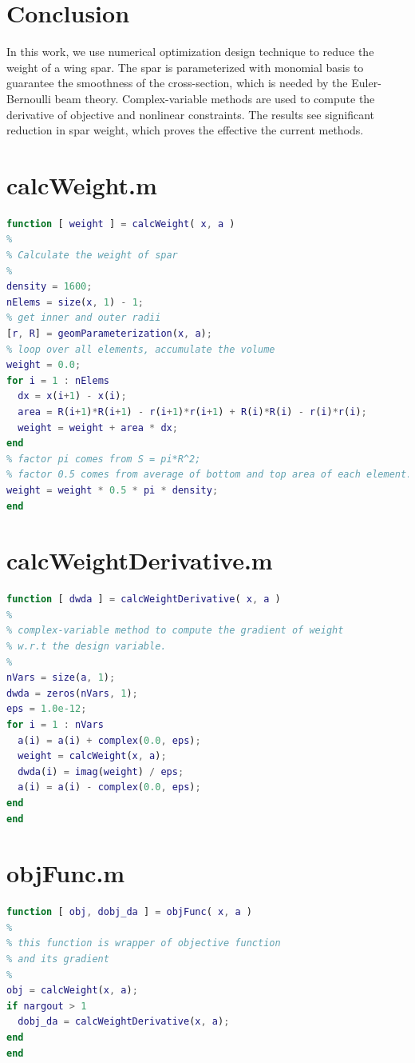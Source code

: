 \documentclass[a4paper]{article}
\begin{document}
\section{Conclusion}
In this work, we use numerical optimization design technique to reduce the weight of a wing spar. The spar is parameterized with monomial basis to guarantee the smoothness of the cross-section, which is needed by the Euler-Bernoulli beam theory. Complex-variable methods are used to compute the derivative of objective and nonlinear constraints. The results see significant reduction in spar weight, which proves the effective the current methods.

\small
\begin{appendices} 
\section{calcWeight.m}\label{app:calcweight}
\begin{lstlisting}[language=Matlab]
function [ weight ] = calcWeight( x, a )
%
% Calculate the weight of spar
%
density = 1600;
nElems = size(x, 1) - 1;
% get inner and outer radii
[r, R] = geomParameterization(x, a);
% loop over all elements, accumulate the volume
weight = 0.0;
for i = 1 : nElems
  dx = x(i+1) - x(i);
  area = R(i+1)*R(i+1) - r(i+1)*r(i+1) + R(i)*R(i) - r(i)*r(i);
  weight = weight + area * dx;
end
% factor pi comes from S = pi*R^2; 
% factor 0.5 comes from average of bottom and top area of each element.
weight = weight * 0.5 * pi * density;
end

\end{lstlisting}

\section{calcWeightDerivative.m}\label{app:calcweightderiv}
\begin{lstlisting}[language=Matlab]
function [ dwda ] = calcWeightDerivative( x, a )
%
% complex-variable method to compute the gradient of weight
% w.r.t the design variable.
%
nVars = size(a, 1);
dwda = zeros(nVars, 1);
eps = 1.0e-12;
for i = 1 : nVars
  a(i) = a(i) + complex(0.0, eps);
  weight = calcWeight(x, a);
  dwda(i) = imag(weight) / eps;
  a(i) = a(i) - complex(0.0, eps);
end
end

\end{lstlisting}

\section{objFunc.m}\label{app:calcobj}
\begin{lstlisting}[language=Matlab]
function [ obj, dobj_da ] = objFunc( x, a )
%
% this function is wrapper of objective function
% and its gradient
%
obj = calcWeight(x, a);
if nargout > 1 
  dobj_da = calcWeightDerivative(x, a);
end
end
\end{lstlisting}


\end{appendices}
\end{document}
